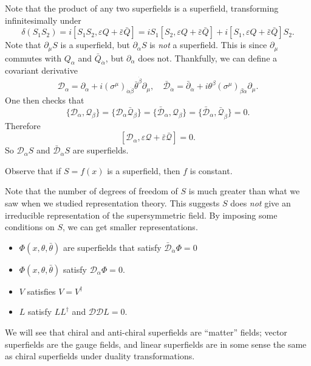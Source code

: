 \documentclass[a4paper]{article}
\begin{document}
Note that the product of any two superfields is a superfield, transforming infinitesimally under
\[
  \delta (S_1 S_2) = i [S_1 S_2, \varepsilon Q + \bar{\varepsilon} \bar{Q}] = i S_1 [S_2, \varepsilon Q + \bar{\varepsilon} \bar{Q}] + i [S_1, \varepsilon Q + \bar{\varepsilon} \bar{Q}] S_2.
\]
Note that $\partial_\mu S$ is a superfield, but $\partial_\alpha S$ is \emph{not} a superfield. This is since $\partial_\mu$ commutes with $Q_\alpha$ and $\bar{Q}_{\dot{\alpha}}$, but $\partial_\dot{\alpha}$ does not. Thankfully, we can define a covariant derivative
\[
  \mathcal{D}_\alpha = \partial_\alpha + i (\sigma^\mu)_{\dot{\alpha} \dot{\beta}} \bar{\theta}^{\dot{\beta}} \partial_\mu,\quad \bar{\mathcal{D}}_{\dot{\alpha}} = \bar{\partial}_{\dot{\alpha}} + i \theta^\beta (\sigma^\mu)_{\beta \dot{\alpha}} \partial_\mu.
\]
One then checks that
\[
  \{\mathcal{D}_\alpha, \mathcal{Q}_\beta\} = \{\mathcal{D}_\alpha \bar{\mathcal{Q}}_{\beta}\} = \{\bar{\mathcal{D}}_\alpha, \mathcal{Q}_\beta\} = \{\bar{\mathcal{D}}_\alpha, \bar{\mathcal{Q}}_{\dot{\beta}}\} = 0.
\]
Therefore
\[
  [\mathcal{D}_\alpha, \varepsilon \mathcal{Q} + \bar{\varepsilon} \bar{\mathcal{Q}}] = 0.
\]
So $\mathcal{D}_\alpha S$ and $\bar{\mathcal{D}}_{\dot{\alpha}} S$ are superfields.

Observe that if $S = f(x)$ is a superfield, then $f$ is constant.

Note that the number of degrees of freedom of $S$ is much greater than what we saw when we studied representation theory. This suggests $S$ does \emph{not} give an irreducible representation of the supersymmetric field. By imposing some conditions on $S$, we can get smaller representations.
\begin{itemize}
  \item {} $\Phi(x, \theta, \bar{\theta})$ are superfields that satisfy $\bar{\mathcal{D}}_{\dot{\alpha}} \Phi = 0$
  \item {} $\Phi(x, \theta, \bar{\theta})$ satisfy $\mathcal{D}_\alpha \Phi = 0$.
  \item {} $V$ satisfies $V = V^\dagger$
  \item {} $L$ satisfy $LL^\dagger$ and $\mathcal{D} \mathcal{D} L = 0$.
\end{itemize}
We will see that chiral and anti-chiral superfields are ``matter'' fields; vector superfields are the gauge fields, and linear superfields are in some sense the same as chiral superfields under duality transformations.
\end{document}
